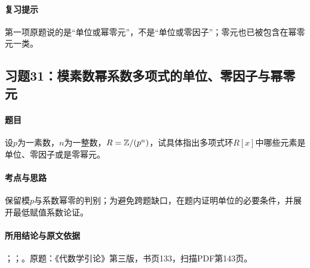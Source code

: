 \paragraph{复习提示}

第一项原题说的是“单位或幂零元”，不是“单位或零因子”；零元也已被包含在幂零元一类。



\subsection{习题31：模素数幂系数多项式的单位、零因子与幂零元}

\label{ex:3:31}

\paragraph{题目}

设$p$为一素数，$n$为一整数，$R=\mathbb Z/(p^n)$，试具体指出多项式环$R[x]$中哪些元素是单位、零因子或是零幂元。

\paragraph{考点与思路}

保留模$p$与系数幂零的判别；为避免跨题缺口，在题内证明单位的必要条件，并展开最低赋值系数论证。

\paragraph{所用结论与原文依据}

；；。原题：《代数学引论》第三版，书页133，扫描PDF第143页。


